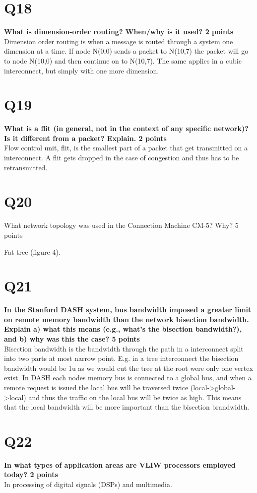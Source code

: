 \documentclass[a4paper]{article}
\begin{document}
\section*{Q18}
\large{\textbf{
What is dimension-order routing? When/why is it used? 2 points\\}}
Dimension order routing is when a message is routed through a system one dimension at a time. If node N(0,0) sends a packet to N(10,7) the packet will go to node N(10,0) and then continue on to N(10,7). The same applies in a cubic interconnect, but simply with one more dimension.  

\section*{Q19}
\large{\textbf{
What is a flit (in general, not in the context of any specific     network)? Is it different from a packet? Explain. 2 points\\}}
Flow control unit, flit, is the smallest part of a packet that get transmitted on a interconnect. A flit gets dropped in the case of congestion and thus has to be retransmitted.

\section*{Q20}
What network topology was used in the Connection Machine CM-5? Why? 5 points

Fat tree (figure 4). 

\section*{Q21}
\large{\textbf{
In the Stanford DASH system, bus bandwidth imposed a greater limit on remote memory bandwidth than the network bisection bandwidth. Explain a) what this means (e.g., what’s the bisection     bandwidth?), and b) why was this the case? 5 points \\}}
Bisection bandwidth is the bandwidth through the path in a interconnect split into two parts at most narrow point. E.g. in a tree interconnect the bisection bandwidth would be 1u as we would cut the tree at the root were only one vertex exist. In DASH each nodes memory bus is connected to a global bus, and when a remote request is issued the local bus will be traversed twice (local->global->local) and thus the traffic on the local bus will be twice as high. This means that the local bandwidth will be more important than the bisection brandwidth.   

\section*{Q22}
\large{\textbf{
In what types of application areas are VLIW processors employed today? 2 points\\}}
In processing of digital signals (DSPs) and multimedia.
\end{document}
